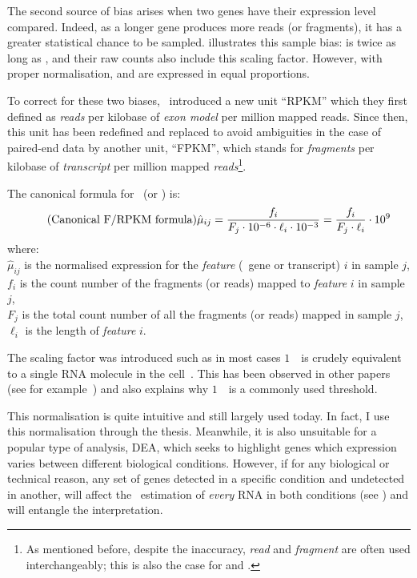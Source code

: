 The second source of bias arises when two genes have their expression level
compared. Indeed, as a longer gene produces more reads (or fragments), it has a
greater statistical chance to be sampled.  illustrates
this sample bias:  is twice as long as , and their
raw counts also include this scaling factor. However, with proper normalisation,
 and  are expressed in equal proportions.\mybr\

To correct for these two biases,~\citet{Mortazavi2008} introduced a new unit
\enquote{RPKM} which they first defined as \emph{reads} per
kilobase of \emph{exon model} per million mapped reads.
Since then, this unit has been redefined and replaced
to avoid ambiguities in the case of paired-end data by another unit,
\enquote{FPKM}, which stands for \emph{fragments} per
kilobase of \emph{transcript} per million mapped \emph{reads}\footnote{As
mentioned before, despite the inaccuracy,
\emph{read} and \emph{fragment} are often used interchangeably;
this is also the case for \emph{\RPKM} and \emph{\FPKM}.}.\mybr\

The canonical formula for \FPKM\ (or \RPKM) is:
\vspace{-1mm}
\begin{equation}
    \tag{Canonical F/RPKM formula}\label{eq:rpkm-fx}
\hat{\mu}_{ij}=\frac{f_i}{F_j\cdot10^{-6} \cdot \ell_i\cdot10^{-3}}
              =\frac{f_i}{F_j\cdot\ell_i}\cdot10^{9} \text{\,}
\vspace{-3mm}
\end{equation}
where: \\{\small
$\hat{\mu}_{ij}$ is the normalised expression for the \emph{feature} (\eg\ gene or
transcript) $i$ in sample $j$,\\
$f_i$ is the count number of the fragments (or reads) mapped to
\emph{feature} $i$ in sample $j$,\\
$F_j$ is the total count number of all the fragments (or reads) mapped in
sample $j$,\\
$\ell_i$ is the length of \emph{feature} $i$.
}

The scaling factor was introduced such as in most cases $1$\ \FPKM\ is
crudely equivalent to a single \gls{RNA} molecule in the cell~. This
has been observed in other papers (see for example~\cite{Hebenstreit:2011}) and
also explains why $1$\ \FPKM\ is a commonly used threshold.%
\mybr\

This normalisation is quite intuitive and still largely used today.
In fact, I use this normalisation through the thesis.
Meanwhile, it is also unsuitable for a popular type of analysis,
\gls{DEA}, which seeks to highlight genes which expression varies
between different biological conditions.
However, if for any biological or technical reason,
any set of genes detected in a specific condition and undetected in another,
will affect the \FPKM\ estimation of \emph{every} \gls{RNA}
in both conditions (see )
and will entangle the interpretation.\mybr\

